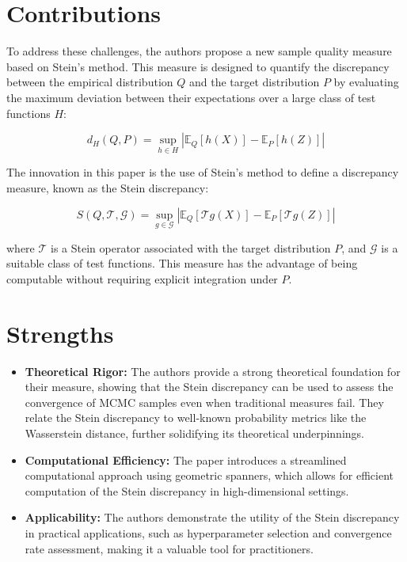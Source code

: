 \documentclass{article}
\begin{document}
	\section*{Contributions}
	To address these challenges, the authors propose a new sample quality measure based on Stein's method. This measure is designed to quantify the discrepancy between the empirical distribution \(Q\) and the target distribution \(P\) by evaluating the maximum deviation between their expectations over a large class of test functions \(H\):
	
	\[
	d_H(Q, P) = \sup_{h \in H} \left| \mathbb{E}_Q[h(X)] - \mathbb{E}_P[h(Z)] \right|
	\]
	
	The innovation in this paper is the use of Stein's method to define a discrepancy measure, known as the Stein discrepancy:
	
	\[
	S(Q, \mathcal{T}, \mathcal{G}) = \sup_{g \in \mathcal{G}} \left| \mathbb{E}_Q[\mathcal{T}g(X)] - \mathbb{E}_P[\mathcal{T}g(Z)] \right|
	\]
	
	where \(\mathcal{T}\) is a Stein operator associated with the target distribution \(P\), and \(\mathcal{G}\) is a suitable class of test functions. This measure has the advantage of being computable without requiring explicit integration under \(P\).
	
	\section*{Strengths}
	\begin{itemize}
		\item \textbf{Theoretical Rigor:} The authors provide a strong theoretical foundation for their measure, showing that the Stein discrepancy can be used to assess the convergence of MCMC samples even when traditional measures fail. They relate the Stein discrepancy to well-known probability metrics like the Wasserstein distance, further solidifying its theoretical underpinnings.
		\item \textbf{Computational Efficiency:} The paper introduces a streamlined computational approach using geometric spanners, which allows for efficient computation of the Stein discrepancy in high-dimensional settings.
		\item \textbf{Applicability:} The authors demonstrate the utility of the Stein discrepancy in practical applications, such as hyperparameter selection and convergence rate assessment, making it a valuable tool for practitioners.
	\end{itemize}
	
\end{document}
